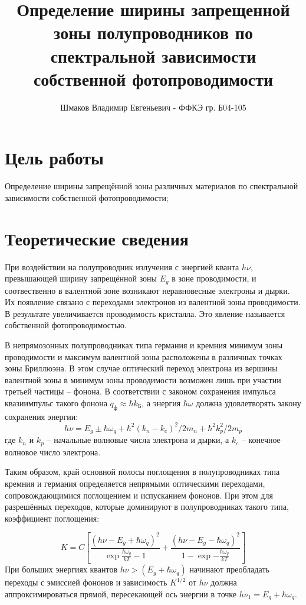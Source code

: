 \documentclass[a4paper, 14pt]{article}
\title{\textcolor{main_title}{Определение ширины запрещенной зоны полупроводников по спектральной зависимости собственной фотопроводимости}}
\author{Шмаков Владимир Евгеньевич - ФФКЭ гр. Б04-105}
\begin{document}
\maketitle



\section*{\textcolor{header}{Цель работы}}

    Определение ширины запрещённой зоны различных материалов по спектральной зависимости собственной фотопроводимости;


\section*{\textcolor{header}{Теоретические сведения}}
При воздействии на полупроводник излучения с энергией кванта $h\nu$, превышающей ширину запрещённой зоны $E_g$ в зоне проводимости, и соотвественно в валентной зоне возникают неравновесные электроны и дырки. Их появление связано с переходами электронов из валентной зоны проводимости. В результате увеличивается проводимость кристалла. Это явление называется собственной фотопроводимостью.

В непрямозонных полупроводниках типа германия и кремния минимум зоны проводимости и максимум валентной зоны расположены в различных точках зоны Бриллюэна. В этом случае оптический переход электрона из вершины валентной зоны в минимум зоны проводимости возможен лишь при участии третьей частицы – фонона. В соответствии с законом сохранения импульса квазиимпульс такого фонона $q_{\text{ф}}\approx\hbar k_{\text{Б}}$, а энергия $\hbar\omega$ должна удовлетворять закону сохранения энергии:
\begin{equation}
    h\nu = E_g\pm \hbar\omega_q+\hbar^2(k_n-k_c)^2/2m_n+\hbar^2k_p^2/2m_p
\end{equation}
где $k_n$ и $k_p$ -- начальные волновые числа электрона и дырки, а $k_c$ -- конечное волновое число электрона.

Таким образом, край основной полосы поглощения в полупроводниках типа кремния и германия определяется непрямыми оптическими переходами, сопровождающимися поглощением и испусканием фононов. При этом для разрешённых переходов, которые доминируют в полупроводниках такого типа, коэффициент поглощения:

\begin{equation}
    K=C\left[\frac{(h\nu-E_g+\hbar\omega_q)^2}{\exp{\frac{\hbar\omega_q}{kT}}-1}+\frac{(h\nu-E_g-\hbar\omega_q)^2}{1-\exp{-\frac{\hbar\omega_q}{kT}}}\right]
\end{equation}
При больших энергиях квантов $h\nu>(E_g+\hbar\omega_q)$ начинают преобладать переходы с эмиссией фононов и зависимость $K^{1/2}$ от $h\nu$ должна аппроксимироваться прямой, пересекающей ось энергии в точке $h\nu_1=E_g+\hbar\omega_q$.
\end{document}
